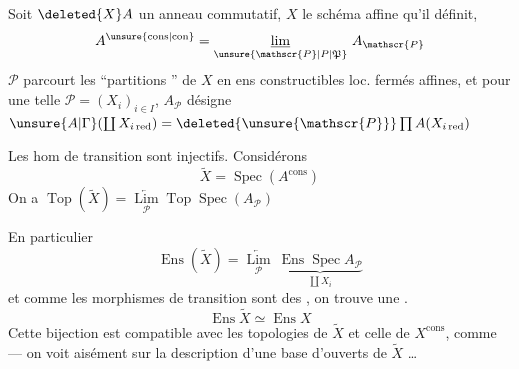 Soit $\deleted{X}A$ un anneau commutatif, $X$ le schéma affine qu'il définit,
\[
 A^{\unsure{\mathrm{cons}|\mathrm{con}}}
 =\underset{\unsure{\mathscr{P}|P|\mathfrak P}}{\underline{\lim}}\ A_{\mathscr{P}}
\]
$\mathscr{P}$ parcourt les ``partitions '' de $X$ en ens constructibles loc. fermés  affines, et pour une telle $\mathscr{P}=(X_i)_{i\in I}$, $A_{\mathscr{P}}$ désigne  $\unsure{A|\Gamma}(\coprod X_{i\,\mathrm{red}})=\deleted{\unsure{\mathscr{P}}}\prod A(X_{i\,\mathrm{red}})$

Les hom de transition sont injectifs. Considérons
\[
 \widetilde X=\operatorname{Spec}(A^{\mathrm{cons}})
\]
On a $\operatorname{Top}(\widetilde X)=\underset{\mathscr P}{\underleftarrow{\operatorname{Lim}}}\operatorname{Top}\operatorname{Spec}(A_{\mathscr P})$

En particulier
\[
 \operatorname{Ens}(\widetilde X)=\underset{\mathscr P}{\underleftarrow{\operatorname{Lim}}}\ 
 \underbrace{\operatorname{Ens}\operatorname{Spec} A_{\mathscr P}}_{\coprod X_i}
\]
et comme les morphismes de transition sont des , on trouve  une .
\[
 \operatorname{Ens}\widetilde X\simeq\operatorname{Ens} X
\]
Cette bijection est compatible avec les topologies de $\widetilde X$ et celle de $X^{\mathrm{cons}}$, comme --- on voit aisément sur la description d'une base d'ouverts de $\widetilde X$ \ldots
